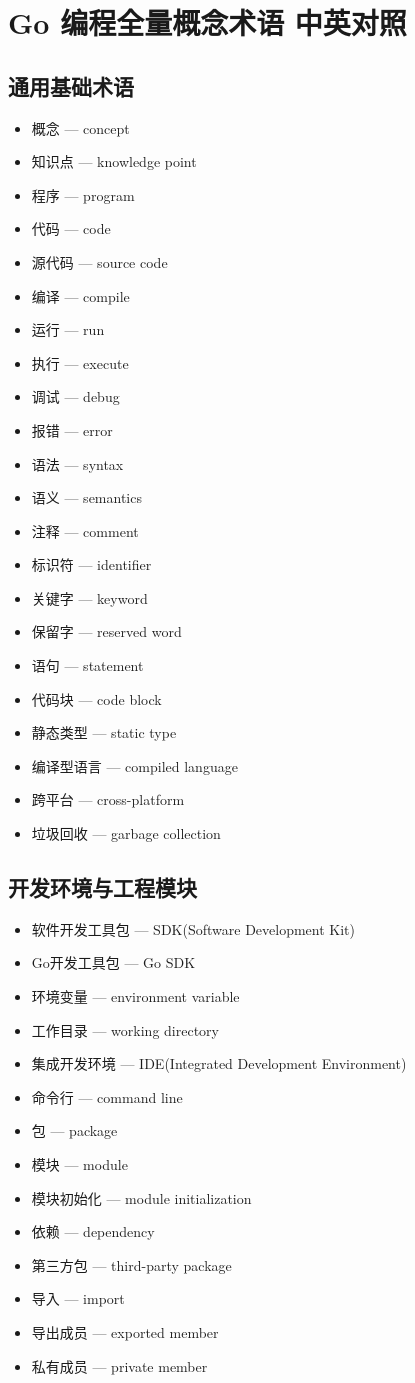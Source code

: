 
\section{Go 编程全量概念术语 中英对照}

\subsection{通用基础术语}
\begin{itemize}
\item 概念 — concept
\item 知识点 — knowledge point
\item 程序 — program
\item 代码 — code
\item 源代码 — source code
\item 编译 — compile
\item 运行 — run
\item 执行 — execute
\item 调试 — debug
\item 报错 — error
\item 语法 — syntax
\item 语义 — semantics
\item 注释 — comment
\item 标识符 — identifier
\item 关键字 — keyword
\item 保留字 — reserved word
\item 语句 — statement
\item 代码块 — code block
\item 静态类型 — static type
\item 编译型语言 — compiled language
\item 跨平台 — cross-platform
\item 垃圾回收 — garbage collection
\end{itemize}

\subsection{开发环境与工程模块}
\begin{itemize}
\item 软件开发工具包 — SDK(Software Development Kit)
\item Go开发工具包 — Go SDK
\item 环境变量 — environment variable
\item 工作目录 — working directory
\item 集成开发环境 — IDE(Integrated Development Environment)
\item 命令行 — command line
\item 包 — package
\item 模块 — module
\item 模块初始化 — module initialization
\item 依赖 — dependency
\item 第三方包 — third-party package
\item 导入 — import
\item 导出成员 — exported member
\item 私有成员 — private member
\end{itemize}

